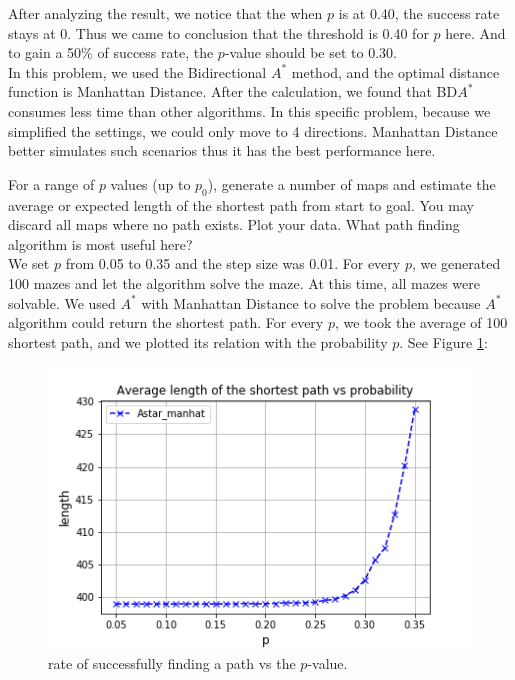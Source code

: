 \documentclass[letter]{article}
\begin{document}
\begin{questions}
	After analyzing the result, we notice that the when $ p $ is at 0.40, the success rate stays at 0. Thus we came to conclusion that the threshold is 0.40 for $ p $ here. And to gain a  50\%  of success rate, the $ p $-value should be set to 0.30. \\
	
	In this problem, we used the Bidirectional $ A^* $ method, and the optimal distance function is Manhattan Distance. After the calculation, we found that BD$ A^* $ consumes less time than other algorithms. In this specific problem, because we simplified the settings, we could only move to 4 directions. Manhattan Distance better simulates such scenarios thus it has the best performance here. \\
	
	
	\item {For a range of $ p $ values (up to $ p_0 $), generate a number of maps and estimate the average or expected length of the shortest path from start to goal. You may discard all maps where no path exists. Plot your data. What path finding algorithm is most useful here?} \\
	
	We set $ p $ from 0.05 to 0.35 and the step size was 0.01. For every $ p $, we generated 100 mazes and let the algorithm solve the maze. At this time, all mazes were solvable. We used $ A^* $ with Manhattan Distance to solve the problem because $ A^* $ algorithm could return the shortest path. For every $ p $, we took the average of 100 shortest path, and we plotted its relation with the probability $ p $. See Figure \ref{fig:4}: \\
		
	\begin{figure}
		\centering
		\includegraphics[width=\textwidth]{../pics/question4.png}
		\caption{\label{fig:4}rate of successfully finding a path vs the $ p $-value.}
	\end{figure}


\end{questions}
\end{document}
